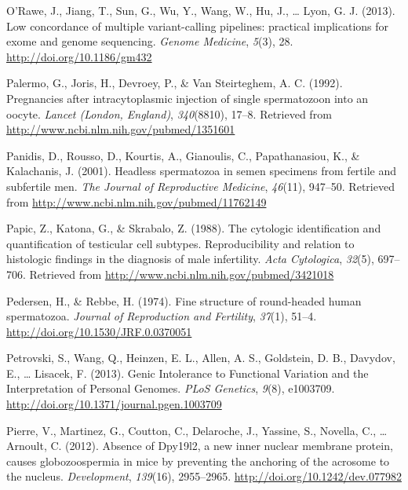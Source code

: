 \documentclass[12pt,twoside]{reedthesis}
\theoremstyle{definition}
\theoremstyle{definition}
\theoremstyle{remark}
\begin{document}
  \hypertarget{ref-ORawe2013}{}
  O'Rawe, J., Jiang, T., Sun, G., Wu, Y., Wang, W., Hu, J., \ldots{} Lyon,
  G. J. (2013). Low concordance of multiple variant-calling pipelines:
  practical implications for exome and genome sequencing. \emph{Genome
  Medicine}, \emph{5}(3), 28. \url{http://doi.org/10.1186/gm432}
  
  \hypertarget{ref-Palermo1992}{}
  Palermo, G., Joris, H., Devroey, P., \& Van Steirteghem, A. C. (1992).
  Pregnancies after intracytoplasmic injection of single spermatozoon into
  an oocyte. \emph{Lancet (London, England)}, \emph{340}(8810), 17--8.
  Retrieved from \url{http://www.ncbi.nlm.nih.gov/pubmed/1351601}
  
  \hypertarget{ref-Panidis2001}{}
  Panidis, D., Rousso, D., Kourtis, A., Gianoulis, C., Papathanasiou, K.,
  \& Kalachanis, J. (2001). Headless spermatozoa in semen specimens from
  fertile and subfertile men. \emph{The Journal of Reproductive Medicine},
  \emph{46}(11), 947--50. Retrieved from
  \url{http://www.ncbi.nlm.nih.gov/pubmed/11762149}
  
  \hypertarget{ref-Papic}{}
  Papic, Z., Katona, G., \& Skrabalo, Z. (1988). The cytologic
  identification and quantification of testicular cell subtypes.
  Reproducibility and relation to histologic findings in the diagnosis of
  male infertility. \emph{Acta Cytologica}, \emph{32}(5), 697--706.
  Retrieved from \url{http://www.ncbi.nlm.nih.gov/pubmed/3421018}
  
  \hypertarget{ref-Pedersen1974}{}
  Pedersen, H., \& Rebbe, H. (1974). Fine structure of round-headed human
  spermatozoa. \emph{Journal of Reproduction and Fertility}, \emph{37}(1),
  51--4. \url{http://doi.org/10.1530/JRF.0.0370051}
  
  \hypertarget{ref-Petrovski2013}{}
  Petrovski, S., Wang, Q., Heinzen, E. L., Allen, A. S., Goldstein, D. B.,
  Davydov, E., \ldots{} Lisacek, F. (2013). Genic Intolerance to
  Functional Variation and the Interpretation of Personal Genomes.
  \emph{PLoS Genetics}, \emph{9}(8), e1003709.
  \url{http://doi.org/10.1371/journal.pgen.1003709}
  
  \hypertarget{ref-Pierre2012}{}
  Pierre, V., Martinez, G., Coutton, C., Delaroche, J., Yassine, S.,
  Novella, C., \ldots{} Arnoult, C. (2012). Absence of Dpy19l2, a new
  inner nuclear membrane protein, causes globozoospermia in mice by
  preventing the anchoring of the acrosome to the nucleus.
  \emph{Development}, \emph{139}(16), 2955--2965.
  \url{http://doi.org/10.1242/dev.077982}
  
\end{document}
